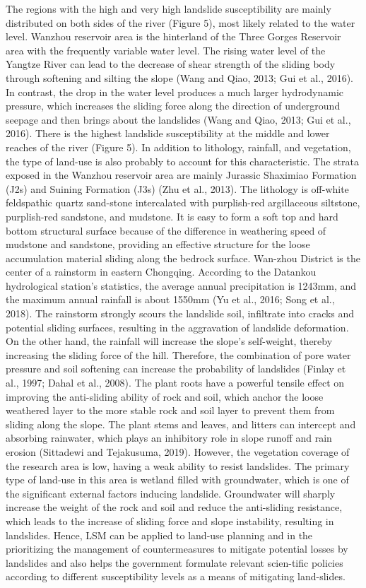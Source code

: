 \documentclass[a4paper,fleqn]{cas-sc}
\begin{document}
The regions with the high and very high landslide susceptibility are mainly distributed on both sides of the river (Figure 5), most likely related to the water level. Wanzhou reservoir area is the hinterland of the Three Gorges Reservoir area with the frequently variable water level. The rising water level of the Yangtze River can lead to the decrease of shear strength of the sliding body through softening and silting the slope (Wang and Qiao, 2013; Gui et al., 2016). In contrast, the drop in the water level produces a much larger hydrodynamic pressure, which increases the sliding force along the direction of underground seepage and then brings about the landslides (Wang and Qiao, 2013; Gui et al., 2016). There is the highest landslide susceptibility at the middle and lower reaches of the river (Figure 5). In addition to lithology, rainfall, and vegetation, the type of land-use is also probably to account for this characteristic. The strata exposed in the Wanzhou reservoir area are mainly Jurassic Shaximiao Formation (J2s) and Suining Formation (J3s) (Zhu et al., 2013). The lithology is off-white feldspathic quartz sand-stone intercalated with purplish-red argillaceous siltstone, purplish-red sandstone, and mudstone. It is easy to form a soft top and hard bottom structural surface because of the difference in weathering speed of mudstone and sandstone, providing an effective structure for the loose accumulation material sliding along the bedrock surface. Wan-zhou District is the center of a rainstorm in eastern Chongqing. According to the Datankou hydrological station's statistics, the average annual precipitation is 1243mm, and the maximum annual rainfall is about 1550mm (Yu et al., 2016; Song et al., 2018). The rainstorm strongly scours the landslide soil, infiltrate into cracks and potential sliding surfaces, resulting in the aggravation of landslide deformation. On the other hand, the rainfall will increase the slope's self-weight, thereby increasing the sliding force of the hill. Therefore, the combination of pore water pressure and soil softening can increase the probability of landslides (Finlay et al., 1997; Dahal et al., 2008). The plant roots have a powerful tensile effect on improving the anti-sliding ability of rock and soil, which anchor the loose weathered layer to the more stable rock and soil layer to prevent them from sliding along the slope. The plant stems and leaves, and litters can intercept and absorbing rainwater, which plays an inhibitory role in slope runoff and rain erosion (Sittadewi and Tejakusuma, 2019). However, the vegetation coverage of the research area is low, having a weak ability to resist landslides. The primary type of land-use in this area is wetland filled with groundwater, which is one of the significant external factors inducing landslide. Groundwater will sharply increase the weight of the rock and soil and reduce the anti-sliding resistance, which leads to the increase of sliding force and slope instability, resulting in landslides. Hence, LSM can be applied to land-use planning and in the prioritizing the management of countermeasures to mitigate potential losses by landslides and also helps the government formulate relevant scien-tific policies according to different susceptibility levels as a means of mitigating land-slides. 
\end{document}
